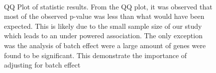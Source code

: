 \begin{figure}
{		\label{fig:omegaSALWald}
	}\\
	\caption[QQ Plot Statistic Results]
	{QQ Plot of statistic results.
		From the QQ plot, it was observed that most of the observed p-value was less than what would have been expected. 
		This is likely due to the small sample size of our study which leads to an under powered association.
		The only exception was the analysis of batch effect were a large amount of genes were found to be significant. 
		This demonstrate the importance of adjusting for batch effect} 
	\label{fig:waldQQ}
\end{figure}
